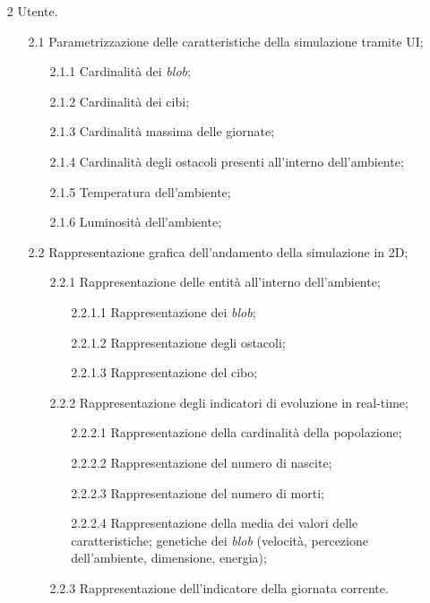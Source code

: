 \begin{enumerate}
    \item[2] Utente.
    \begin{enumerate}[label*=\arabic*.]
        \item[2.1] Parametrizzazione delle caratteristiche della simulazione tramite UI;
        \begin{enumerate}[label*=\arabic*.]
            \item[2.1.1] Cardinalità dei \textit{blob};
            \item[2.1.2] Cardinalità dei cibi;
            \item[2.1.3] Cardinalità massima delle giornate;
            \item[2.1.4] Cardinalità degli ostacoli presenti all'interno dell'ambiente;
            \item[2.1.5] Temperatura dell'ambiente;
            \item[2.1.6] Luminosità dell'ambiente;
        \end{enumerate}
        \item[2.2] Rappresentazione grafica dell'andamento della simulazione in 2D;
        \begin{enumerate}[label*=\arabic*.]
            \item[2.2.1] Rappresentazione delle entità all'interno dell'ambiente;
            \begin{enumerate}[label*=\arabic*.]
                \item[2.2.1.1] Rappresentazione dei \textit{blob};
                \item[2.2.1.2] Rappresentazione degli ostacoli;
                \item[2.2.1.3] Rappresentazione del cibo;
            \end{enumerate}
            \item[2.2.2] Rappresentazione degli indicatori di evoluzione in real-time;
            \begin{enumerate}[label*=\arabic*.]
                \item[2.2.2.1] Rappresentazione della cardinalità della popolazione;
                \item[2.2.2.2] Rappresentazione del numero di nascite;
                \item[2.2.2.3] Rappresentazione del numero di morti;
                \item[2.2.2.4] Rappresentazione della media dei valori delle caratteristiche; genetiche dei \textit{blob} (velocità, percezione dell'ambiente, dimensione, energia);
            \end{enumerate}
            \item[2.2.3] Rappresentazione dell'indicatore della giornata corrente.
        \end{enumerate}
    \end{enumerate}
\end{enumerate}

